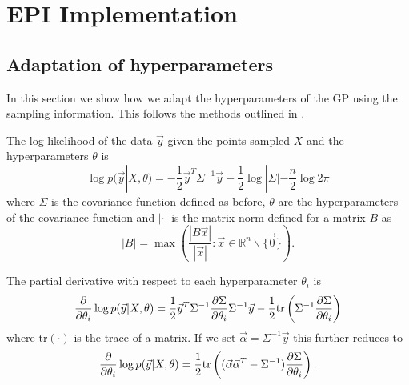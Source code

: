\documentclass[index]{subfiles}
\begin{document}

\section{EPI Implementation} %
\label{cha:EPI Implementation}

\subsection{Adaptation of hyperparameters} %
\label{sec:Adaptation of hyperparameters}

In this section we show how we adapt the hyperparameters of the GP using the sampling information. This follows the methods outlined in \cite{RW}.

The log-likelihood of the data $\vec{y}$ given the points sampled $X$ and the hyperparameters $\theta$ is
\begin{equation}
    \log p(\vec{y}|X, \theta) = -\frac{1}{2}\vec{y}^{T}\Sigma^{-1}\vec{y} - \frac{1}{2}\log|\Sigma| - \frac{n}{2} \log 2\pi
\end{equation}
where $\Sigma$ is the covariance function defined as before, $\theta$ are the hyperparameters of the covariance function and $|\cdot|$ is the matrix norm defined for a matrix $B$ as
\begin{equation}
    |B| = \max \left( \frac{|B\vec{x}|}{|\vec{x}|} : \vec{x} \in \mathbb{R}^{n}\backslash\{\vec{0}\} \right).
\end{equation}

The partial derivative with respect to each hyperparameter $\theta_{i}$ is
\begin{equation}
    \frac{\partial}{\partial \theta_{i}} \log p(\vec{y}|X,\theta) = \frac{1}{2}\vec{y}^{T}\Sigma^{-1}\frac{\partial \Sigma}{\partial \theta_{i}} \Sigma^{-1}\vec{y} - \frac{1}{2} {\rm tr}\left( \Sigma^{-1}\frac{\partial \Sigma}{\partial \theta_{i}} \right)
\end{equation}
where tr$(\cdot)$ is the trace of a matrix. If we set $\vec{\alpha} = \Sigma^{-1}\vec{y}$ this further reduces to
\begin{equation}
    \frac{\partial}{\partial \theta_{i}} \log p(\vec{y}|X,\theta) = \frac{1}{2} {\rm tr}\left((\vec{\alpha}\vec{\alpha}^{T} - \Sigma^{-1})\frac{\partial \Sigma}{\partial \theta_{i}}\right).
\end{equation}
\end{document}
